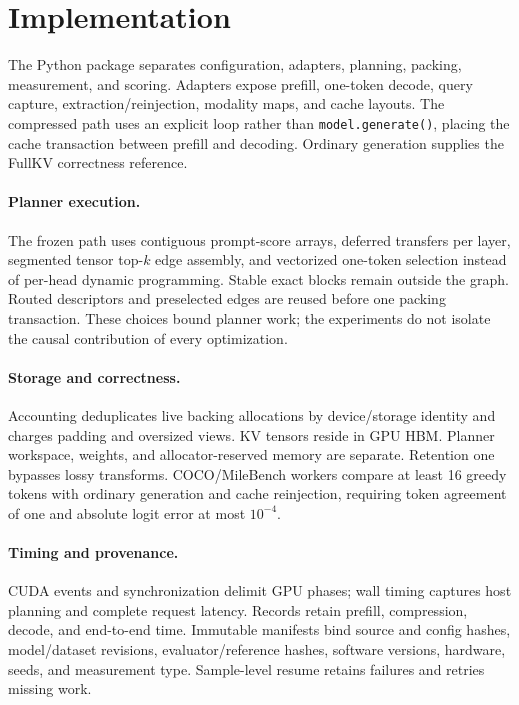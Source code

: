 \section{Implementation}
\label{sec:implementation}
The Python package separates configuration, adapters, planning, packing,
measurement, and scoring. Adapters expose prefill, one-token decode, query
capture, extraction/reinjection, modality maps, and cache layouts. The compressed
path uses an explicit loop rather than \texttt{model.generate()}, placing the
cache transaction between prefill and decoding. Ordinary generation supplies
the FullKV correctness reference.

\paragraph{Planner execution.}
The frozen path uses contiguous prompt-score arrays, deferred transfers per
layer, segmented tensor top-$k$ edge assembly, and vectorized one-token
selection instead of per-head dynamic programming. Stable exact blocks remain
outside the graph. Routed descriptors and preselected edges are reused before
one packing transaction. These choices bound planner work; the experiments
do not isolate the causal contribution of every optimization.

\paragraph{Storage and correctness.}
Accounting deduplicates live backing allocations by device/storage identity
and charges padding and oversized views. KV tensors reside in GPU HBM.
Planner workspace, weights, and allocator-reserved memory are separate.
Retention one bypasses lossy transforms. COCO/MileBench workers compare at
least 16 greedy tokens with ordinary generation and cache reinjection,
requiring token agreement of one and absolute logit error at most $10^{-4}$.

\paragraph{Timing and provenance.}
CUDA events and synchronization delimit GPU phases; wall timing captures
host planning and complete request latency. Records retain prefill,
compression, decode, and end-to-end time. Immutable manifests bind source and
config hashes, model/dataset revisions, evaluator/reference hashes, software
versions, hardware, seeds, and measurement type. Sample-level resume retains
failures and retries missing work.

